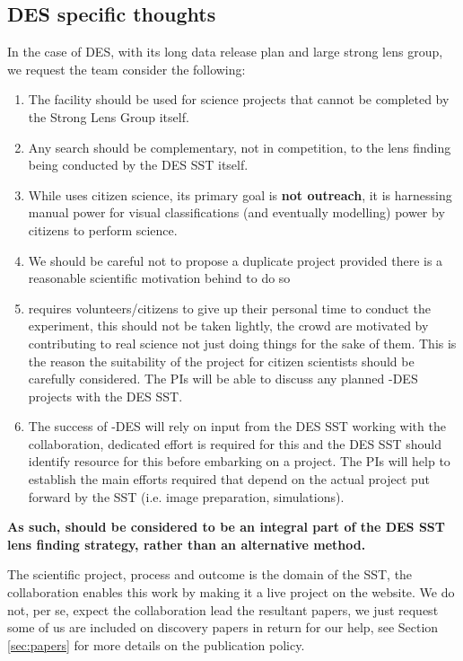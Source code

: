 \documentclass[a4paper,twocolumn]{article}
\begin{document}
\subsection{DES specific thoughts}
In the case of DES, with its long data release plan and large strong lens group, we request the team consider the following:
\begin{enumerate}
\item The \sw facility should be used for science projects that cannot be completed by the Strong Lens Group itself. 
\item Any \sw search should be complementary, not in competition, to the lens finding being conducted by the DES SST itself.
\item While \sw uses citizen science, its primary goal is \textbf{not outreach}, it is harnessing manual power for visual classifications (and eventually modelling) power by citizens to perform science.
\item We should be careful not to propose a duplicate project provided there is a reasonable scientific motivation behind to do so 
\item \sw requires volunteers/citizens to give up their personal time to conduct the experiment, this should not be taken lightly, the crowd are motivated by contributing to real science not just doing things for the sake of them. This is the reason the suitability of the project for citizen scientists should be carefully considered. The \sw PIs will be able to discuss any planned \sw-DES projects with the DES SST.
\item The success of \sw-DES will rely on input from the DES SST working with the \sw collaboration, dedicated effort is required for this and the DES SST should identify resource for this before embarking on a project. The \sw PIs will help to establish the main efforts required that depend on the actual project put forward by the SST (i.e. image preparation, simulations).
\end{enumerate}

\textbf{As such, \sw should be considered to be an integral part of the DES SST lens finding strategy, rather than an alternative method.}

The scientific project, process and outcome is the domain of the SST, the \sw collaboration enables this work by making it a live project on the website. We do not, per se, expect the \sw collaboration lead the resultant papers, we just request some of us are included on discovery papers in return for our help, see Section \ref{sec:papers} for more details on the publication policy.
\end{document}
